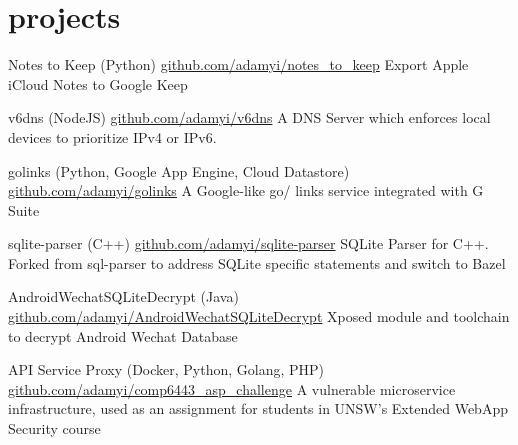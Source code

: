 \documentclass[hidelinks__VERSION__]{adamyi-cv}
\begin{document}

\section{projects}

\begin{entrylist}


\entry
{Notes to Keep (Python)}
{\href{https://github.com/adamyi/notes_to_keep}{github.com/adamyi/notes\_to\_keep}}
{Export Apple iCloud Notes to Google Keep}


\entry
{v6dns (NodeJS)}
{\href{https://github.com/adamyi/v6dns}{github.com/adamyi/v6dns}}
{A DNS Server which enforces local devices to prioritize IPv4 or IPv6.}


\entry
{golinks (Python, Google App Engine, Cloud Datastore)}
{\href{https://github.com/adamyi/golinks}{github.com/adamyi/golinks}}
{A Google-like go/ links service integrated with G Suite}


\entry
{sqlite-parser (C++)}
{\href{https://github.com/adamyi/sqlite-parser}{github.com/adamyi/sqlite-parser}}
{SQLite Parser for C++. Forked from sql-parser to address SQLite specific statements and switch to Bazel}


\entry
{AndroidWechatSQLiteDecrypt (Java)}
{\href{https://github.com/adamyi/AndroidWechatSQLiteDecrypt}{github.com/adamyi/AndroidWechatSQLiteDecrypt}}
{Xposed module and toolchain to decrypt Android Wechat Database}


\entry
{API Service Proxy (Docker, Python, Golang, PHP)}
{\href{https://github.com/adamyi/comp6443_asp_challenge}{github.com/adamyi/comp6443\_asp\_challenge}}
{A vulnerable microservice infrastructure, used as an assignment for students in UNSW's Extended WebApp Security course}


\end{entrylist}
\end{document}
